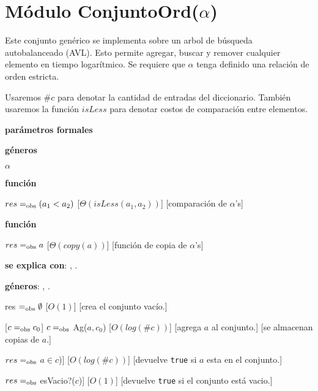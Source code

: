 \section{Módulo ConjuntoOrd($\alpha$)}

Este conjunto genérico se implementa sobre un arbol de búsqueda autobalanceado (AVL). Esto permite agregar, buscar y remover cualquier elemento en tiempo logarítmico. Se requiere que $\alpha$ tenga definido una relación de orden estricta.

Usaremos $\#c$ para denotar la cantidad de entradas del diccionario. También usaremos la función $isLess$ para denotar costos de comparación entre elementos.

\begin{Interfaz}

	\textbf{parámetros formales}\parindent\\
	\parbox{1.7cm}{\textbf{géneros}}$\alpha$\\
	\parbox[t]{1.7cm}{\textbf{función}}\parbox[t]{.5\textwidth-\parindent-1.7cm}{
		{$res =_{\mathrm{obs}} (a_1 < a_2)$}
		[$\Theta(isLess(a_1, a_2))$]
		[comparación de $\alpha$'s]
	}
	\parbox[t]{1.7cm}{\textbf{función}}\parbox[t]{.5\textwidth-\parindent-1.7cm}{
		{$res =_{\mathrm{obs}} a$}
		[$\Theta(copy(a))$]
		[función de copia de $\alpha$'s]
	}

	\textbf{se explica con}: , .

	\textbf{géneros}: , .


	{res $=_{\mathrm{obs}} \emptyset$ }
	[$O(1)$]
	[crea el conjunto vacío.]

	[$c =_{\mathrm{obs}} c_0$]
	{$c =_{\mathrm{obs}}$ Ag($a, c_0$)}
	[$O(log(\#c))$]
	[agrega $a$ al conjunto.]
	[se almacenan copias de $a$.]

	{$res =_{\mathrm{obs}}$ $a \in c$)]}
	[$O(log(\#c))$]
	[devuelve \texttt{true} si $a$ esta en el conjunto.]

	{$res =_{\mathrm{obs}}$ esVacio?($c$)]}
	[$O(1)$]
	[devuelve \texttt{true} si el conjunto está vacio.]


\end{Interfaz}
